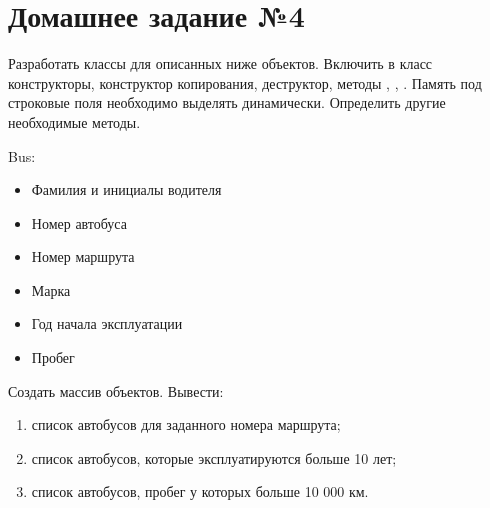 \section*{Домашнее задание №4}

Разработать классы для описанных ниже объектов. Включить в класс
конструкторы, конструктор копирования, деструктор, методы ,
, . Память под строковые поля необходимо выделять
динамически. Определить другие необходимые методы.

Bus:
\begin{itemize}
	\item Фамилия и инициалы водителя
	\item Номер автобуса
	\item Номер маршрута
	\item Марка
	\item Год начала эксплуатации
	\item Пробег
\end{itemize}

Создать массив объектов. Вывести:
\begin{enumerate}
	\item список автобусов для заданного номера маршрута;
	\item список автобусов, которые эксплуатируются больше 10 лет;
	\item список автобусов, пробег у которых больше 10 000 км.
\end{enumerate}
